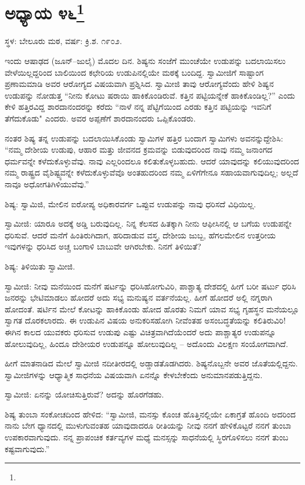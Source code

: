 \chapter[ಅಧ್ಯಾಯ ೪೬]{ಅಧ್ಯಾಯ ೪೬\protect\footnote{}}

\centerline{ಸ್ಥಳ: ಬೇಲೂರು ಮಠ, ವರ್ಷ: ಕ್ರಿ.ಶ. ೧೯೦೨.}

ಇಂದು ಆಷಾಢದ (ಜೂನ್–ಜುಲೈ) ಮೊದಲ ದಿನ. ಶಿಷ್ಯನು ಸಂಜೆಗೆ ಮುಂಚೆಯೇ ಉಡುಪನ್ನು ಬದಲಾಯಿಸಲು ವೇಳೆಯಿಲ್ಲದ್ದರಿಂದ ಬಾಲಿಯಿಂದ ಕಛೇರಿಯ ಉಡುಪಿನಲ್ಲಿಯೇ ಮಠಕ್ಕೆ ಬಂದಿದ್ದ. ಸ್ವಾಮೀಜಿಗೆ ಸಾಷ್ಟಾಂಗ ಪ್ರಣಾಮಮಾಡಿ ಅವರ ಆರೋಗ್ಯದ ವಿಷಯವಾಗಿ ಪ್ರಶ್ನಿಸಿದ. ಸ್ವಾಮೀಜಿ ತಾವು ಆರೋಗ್ಯವೆಂದು ಹೇಳಿ ಶಿಷ್ಯನ ಉಡುಪನ್ನು ನೋಡುತ್ತ “ನೀನು ಕೋಟು ಷರಾಯಿ ಹಾಕಿಕೊಂಡಿರುವೆ. ಕತ್ತಿನ ಪಟ್ಟಿಯನ್ನೇಕೆ ಹಾಕಿಕೊಂಡಿಲ್ಲ?” ಎಂದು ಕೇಳಿ ಹತ್ತಿರವಿದ್ದ ಶಾರದಾನಂದರನ್ನು ಕರೆದು “ನಾಳೆ ನನ್ನ ಪೆಟ್ಟಿಗೆಯಿಂದ ಎರಡು ಕತ್ತಿನ ಪಟ್ಟಿಯನ್ನು ಇವನಿಗೆ ತೆಗೆದುಕೊಡು" ಎಂದರು. ಅವರ ಅಪ್ಪಣೆಗೆ ಶಾರದಾನಂದರು ಒಪ್ಪಿಕೊಂಡರು.

ನಂತರ ಶಿಷ್ಯ ತನ್ನ ಉಡುಪನ್ನು ಬದಲಾಯಿಸಿಕೊಂಡು ಸ್ವಾಮಿಗಳ ಹತ್ತಿರ ಬಂದಾಗ ಸ್ವಾಮಿಗಳು ಅವನನ್ನುದ್ದೇಶಿಸಿ: “ನಮ್ಮ ದೇಶೀಯ ಉಡುಪು, ಆಹಾರ ಮತ್ತು ಜೀವನದ ಕ್ರಮವನ್ನು ಬಿಡುವುದರಿಂದ ನಾವು ನಮ್ಮ ಜನಾಂಗದ ಧರ್ಮವನ್ನೇ ಕಳೆದುಕೊಳ್ಳುವೆವು. ನಾವು ಎಲ್ಲರಿಂದಲೂ ಕಲಿತುಕೊಳ್ಳಬಹುದು. ಆದರೆ ಯಾವುದನ್ನು ಕಲಿಯುವುದರಿಂದ ನಮ್ಮ ರಾಷ್ಟ್ರದ ವೈಶಿಷ್ಟ್ಯವನ್ನೇ ಕಳೆದುಕೊಳ್ಳುವೆವೊ ಅಂತಹುದರಿಂದ ನಮ್ಮ ಏಳಿಗೆಗೇನೂ ಸಹಾಯವಾಗುವುದಿಲ್ಲ; ಅಲ್ಲದೆ ನಾವೂ ಅಧೋಗತಿಗಿಳಿಯುವೆವು.”

ಶಿಷ್ಯ: ಸ್ವಾಮಿಜಿ, ಮೇಲಿನ ಐರೋಪ್ಯ ಅಧಿಕಾರವರ್ಗ ಒಪ್ಪುವ ಉಡುಪನ್ನು ನಾವು ಧರಿಸದೆ ವಿಧಿಯಿಲ್ಲ.

ಸ್ವಾಮೀಜಿ: ಯಾರೂ ಅದಕ್ಕೆ ಅಡ್ಡಿ ಬರುವುದಿಲ್ಲ. ನಿನ್ನ ಕೆಲಸದ ಹಿತಕ್ಕಾಗಿ ನೀನು ಆಫೀಸಿನಲ್ಲಿ ಆ ಬಗೆಯ ಉಡುಪನ್ನೇ ಧರಿಸುವೆ. ಆದರೆ ಮನೆಗೆ ಹಿಂತಿರುಗಿದಾಗ, ಹರಿದಾಡುವ ವಸ್ತ್ರ, ದೇಶೀಯ ಜುಬ್ಬ, ಹೆಗಲಮೇಲಿನ ಉತ್ತರೀಯ ಇವುಗಳನ್ನು ಧರಿಸಿದ ಅಚ್ಚ ಬಂಗಾಳಿ ಬಾಬುವೇ ಆಗಿರಬೇಕು. ನಿನಗೆ ತಿಳಿಯಿತೆ?

ಶಿಷ್ಯ: ತಿಳಿಯಿತು ಸ್ವಾಮೀಜಿ.

ಸ್ವಾಮೀಜಿ: ನೀವು ಮನೆಯಿಂದ ಮನೆಗೆ ಷರ್ಟನ್ನು ಧರಿಸಿಹೋಗುವಿರಿ, ಪಾಶ್ಚಾತ್ಯ ದೇಶದಲ್ಲಿ ಹೀಗೆ ಬರೀ ಷರ್ಟು ಧರಿಸಿ ಜನರನ್ನು ಭೇಟಿಮಾಡಲು ಹೋದರೆ ಅದು ಸಭ್ಯ ಮನುಷ್ಯನ ವರ್ತನೆಯಲ್ಲ. ಹೀಗೆ ಹೋದರೆ ಅಲ್ಲಿ ನಗ್ನರಾಗಿ ಹೋದಂತೆ. ಷರ್ಟಿನ ಮೇಲೆ ಕೋಟನ್ನು ಹಾಕಿಕೊಂಡು ಹೋದ ಹೊರತು ನಿಮಗೆ ಯಾವ ಸಭ್ಯ ಗೃಹಸ್ಥನ ಮನೆಯಲ್ಲೂ ಸ್ವಾಗತ ದೊರಕಲಾರದು. ಈ ಉಡುಪಿನ ವಿಷಯ ಅನುಕರಿಸಹೋಗಿ ನೀವೆಂತಹ ಅಸಂಬದ್ಧತೆಯನ್ನು ಕಲಿತಿರುವಿರಿ! ಈಗಿನ ಕಾಲದ ಯುವಕರು ಧರಿಸುವ ಉಡುಪು ಎಷ್ಟು ವಿಚಿತ್ರವಾಗಿದೆಯೆಂದರೆ ಅದು ಪಾಶ್ಚಾತ್ಯರ ಉಡುಪನ್ನೂ ಹೋಲುವುದಿಲ್ಲ, ಹಿಂದೂ ದೇಶೀಯರ ಉಡುಪನ್ನೂ ಹೋಲುವುದಿಲ್ಲ – ಅದೊಂದು ವಿಲಕ್ಷಣ ಸಂಯೋಗವಾಗಿದೆ.

ಹೀಗೆ ಮಾತನಾಡಿದ ಮೇಲೆ ಸ್ವಾಮೀಜಿ ನದೀತೀರದಲ್ಲಿ ಅಡ್ಡಾಡತೊಡಗಿದರು. ಶಿಷ್ಯನೊಬ್ಬನೇ ಅವರ ಜೊತೆಯಲ್ಲಿದ್ದನು. ಸ್ವಾಮೀಜಿಗಳನ್ನು ಆಧ್ಯಾತ್ಮಿಕ ಸಾಧನೆಯ ವಿಷಯವಾಗಿ ಏನನ್ನೊ ಕೇಳಬೇಕೆಂದು ಅನುಮಾನಪಡುತ್ತಿದ್ದನು.

ಸ್ವಾಮೀಜಿ: ಏನನ್ನು ಯೋಚಿಸುತ್ತಿರುವೆ? ಅದನ್ನು ಹೊರಗೆಡಹು.

ಶಿಷ್ಯ ತುಂಬಾ ಸಂಕೋಚದಿಂದ ಹೇಳಿದ: “ಸ್ವಾಮೀಜಿ, ಮನಸ್ಸು ಕೊಂಚ ಹೊತ್ತಿನಲ್ಲಿಯೇ ಏಕಾಗ್ರತೆ ಹೊಂದಿ ಅದರಿಂದ ನಾನು ಬೇಗ ಧ್ಯಾನದಲ್ಲಿ ಮುಳುಗುವಂತಹ ಯಾವುದಾದರೂ ರೀತಿಯನ್ನು ನೀವು ನನಗೆ ಹೇಳಿಕೊಟ್ಟರೆ ನನಗೆ ತುಂಬಾ ಉಪಕಾರವಾಗುವುದು. ನನ್ನ ಪ್ರಾಪಂಚಿಕ ಕರ್ತವ್ಯಗಳ ಮಧ್ಯೆ ಮನಸ್ಸನ್ನು ಸಾಧನೆಯಲ್ಲಿ ಸ್ಥಿರಗೊಳಿಸಲು ನನಗೆ ತುಂಬ ಕಷ್ಟವಾಗುವುದು.”


